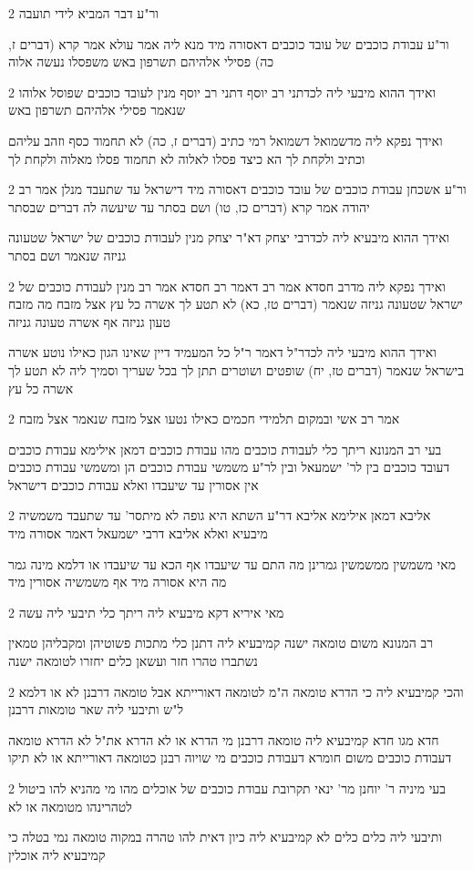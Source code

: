 \documentclass[12pt, openany]{book}
\newcommand{\sethebfont}{
\fontsize{10.5pt}{21.0pt} \selectfont
}
\newcommand{\twocol}[1]{
	{\sethebfont \begin{multicols}{2}
			#1
	\end{multicols}}	
}
\begin{document}
\twocol{ור"ע דבר המביא לידי תועבה
\par ור"ע עבודת כוכבים של עובד כוכבים דאסורה מיד מנא ליה אמר עולא אמר קרא (דברים ז, כה) פסילי אלהיהם תשרפון באש משפסלו נעשה אלוה}
\twocol{ואידך ההוא מיבעי ליה לכדתני רב יוסף דתני רב יוסף מנין לעובד כוכבים שפוסל אלוהו שנאמר פסילי אלהיהם תשרפון באש
\par ואידך נפקא ליה מדשמואל דשמואל רמי כתיב (דברים ז, כה) לא תחמוד כסף וזהב עליהם וכתיב ולקחת לך הא כיצד פסלו לאלוה לא תחמוד פסלו מאלוה ולקחת לך}
\twocol{ור"ע אשכחן עבודת כוכבים של עובד כוכבים דאסורה מיד דישראל עד שתעבד מנלן אמר רב יהודה אמר קרא (דברים כז, טו) ושם בסתר עד שיעשה לה דברים שבסתר
\par ואידך ההוא מיבעיא ליה לכדרבי יצחק דא"ר יצחק מנין לעבודת כוכבים של ישראל שטעונה גניזה שנאמר ושם בסתר}
\twocol{ואידך נפקא ליה מדרב חסדא אמר רב דאמר רב חסדא אמר רב מנין לעבודת כוכבים של ישראל שטעונה גניזה שנאמר (דברים טז, כא) לא תטע לך אשרה כל עץ אצל מזבח מה מזבח טעון גניזה אף אשרה טעונה גניזה
\par ואידך ההוא מיבעי ליה לכדר"ל דאמר ר"ל כל המעמיד דיין שאינו הגון כאילו נוטע אשרה בישראל שנאמר (דברים טז, יח) שופטים ושוטרים תתן לך בכל שעריך וסמיך ליה לא תטע לך אשרה כל עץ}
\twocol{אמר רב אשי ובמקום תלמידי חכמים כאילו נטעו אצל מזבח שנאמר אצל מזבח
\par בעי רב המנונא ריתך כלי לעבודת כוכבים מהו עבודת כוכבים דמאן אילימא עבודת כוכבים דעובד כוכבים בין לר' ישמעאל ובין לר"ע משמשי עבודת כוכבים הן ומשמשי עבודת כוכבים אין אסורין עד שיעבדו ואלא עבודת כוכבים דישראל}
\twocol{אליבא דמאן אילימא אליבא דר"ע השתא היא גופה לא מיתסר' עד שתעבד משמשיה מיבעיא ואלא אליבא דרבי ישמעאל דאמר אסורה מיד
\par מאי משמשין ממשמשין גמרינן מה התם עד שיעבדו אף הכא עד שיעבדו או דלמא מינה גמר מה היא אסורה מיד אף משמשיה אסורין מיד}
\twocol{מאי איריא דקא מיבעיא ליה ריתך כלי תיבעי ליה עשה
\par רב המנונא משום טומאה ישנה קמיבעיא ליה דתנן כלי מתכות פשוטיהן ומקבליהן טמאין נשתברו טהרו חזר ועשאן כלים יחזרו לטומאה ישנה}
\twocol{והכי קמיבעיא ליה כי הדרא טומאה ה"מ לטומאה דאורייתא אבל טומאה דרבנן לא או דלמא ל"ש ותיבעי ליה שאר טומאות דרבנן
\par חדא מגו חדא קמיבעיא ליה טומאה דרבנן מי הדרא או לא הדרא את"ל לא הדרא טומאה דעבודת כוכבים משום חומרא דעבודת כוכבים מי שויוה רבנן כטומאה דאורייתא או לא תיקו}
\twocol{בעי מיניה ר' יוחנן מר' ינאי תקרובת עבודת כוכבים של אוכלים מהו מי מהניא להו ביטול לטהרינהו מטומאה או לא
\par ותיבעי ליה כלים כלים לא קמיבעיא ליה כיון דאית להו טהרה במקוה טומאה נמי בטלה כי קמיבעיא ליה אוכלין}
\end{document}
